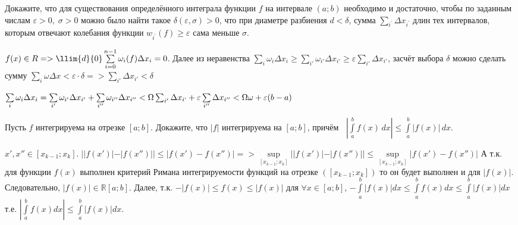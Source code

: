 \documentclass[10pt]{article}
\begin{document}
\vspace{-1ex}
\task Докажите, что для существования определённого интеграла функции $f$ на интервале $(a; b)$ необходимо и достаточно, чтобы по заданным числам $\varepsilon > 0, \; \sigma > 0$ можно было найти такое $\delta(\varepsilon, \sigma) > 0$, что при диаметре разбиения $d < \delta$,
сумма $\sum\limits_{i^{\prime}} \Delta x_{i^{\prime}}$ длин тех интервалов, которым отвечают колебания функции $w_{i^{\prime}}(f) \ge \varepsilon$ сама меньше $\sigma$.
\begin{solution}
  \fbox{=>} $f(x)\in R=>\llim{d}{0}\sum\limits_{i=0}^{n-1}\omega_i(f)\Delta x_i=0$. Далее из неравенства $\sum\limits_i \omega_i\Delta x_i\geqslant\sum\limits_{i'} \omega_{i'}\Delta x_{i'}\geqslant\varepsilon\sum\limits_{i'}\Delta x_{i'}$, засчёт выбора $\delta$ можно сделать сумму $\sum\limits_i \omega\Delta x<\varepsilon\cdot\delta=>\sum\limits_{i'}\Delta x_{i'}<\delta$
  
  \newline\newline\fbox{<=} 
  \newline$\sum\limits_i \omega_i \Delta x_i=\sum\limits_{i'}\omega_{i'}\Delta x_{i'}+\sum\limits_{i''}\omega_{i''}\Delta x_{i''}<\Omega\sum_{i'}\Delta x_{i`}+\varepsilon\sum\limits_{i''}\Delta x_{i''}<\Omega\omega+\varepsilon(b-a)$
\end{solution}
\vspace{-1ex}
\task {}
\pnt Пусть $f$ интегрируема на отрезке $[a; b].$ Докажите, что $|f|$ интегрируема на $[a; b]$, причём
$\;\; \displaystyle  \left|\int\limits_a^b f(x) \, dx\right| \le \int\limits_a^b |f(x)| \, dx.$
\begin{solution}
  \sqsupset $x', x''\in[x_{k-1};x_k].\; ||f(x')|-|f(x'')||\leqslant|f(x')-f(x'')|=>\underset{[x_{k-1};x_k]}{\sup}||f(x')|-|f(x'')||\leqslant\underset{[x_{k-1};x_k]}{\sup}|f(x')-f(x'')|$ А т.к. для функции $f(x)$ выполнен критерий Римана интегрируемости функций на отрезке $([x_{k-1};x_k])$ то он будет выполнен и для $|f(x)|$. Следовательно, $|f(x)|\in\mathds{R}[a;b]$.
  \newline Далее, т.к. $-|f(x)|\leqslant f(x)\leqslant|f(x)|$ для $\forall x \in [a;b]$, 
  $
  -\int\limits_a^b |f(x)|dx\leqslant\int\limits_a^b f(x)dx\leqslant\int\limits_a^b |f(x)|dx\;\;
  $
  т.е. $|\int\limits_a^b f(x)dx|\leqslant\int\limits_a^b |f(x)|dx.$
\end{solution}
\end{document}
